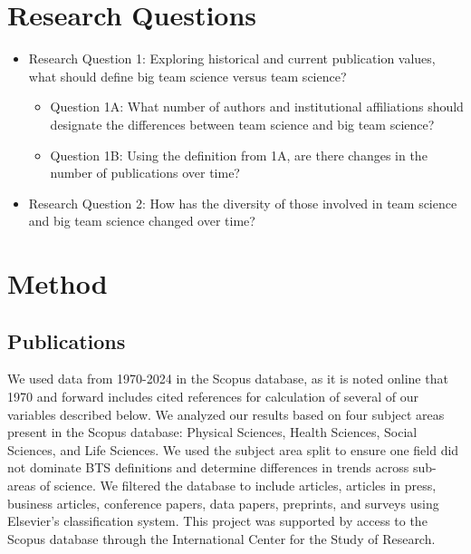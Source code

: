 \documentclass[
  man,floatsintext]{apa7}
\providecommand{\tightlist}{%
  \setlength{\itemsep}{0pt}\setlength{\parskip}{0pt}}
\begin{document}
\section{Research Questions}\label{research-questions}

\begin{itemize}
\tightlist
\item
  Research Question 1: Exploring historical and current publication
  values, what should define big team science versus team science?

  \begin{itemize}
  \tightlist
  \item
    Question 1A: What number of authors and institutional
    affiliations should designate the differences between team
    science and big team science?
  \item
    Question 1B: Using the definition from 1A, are there changes in
    the number of publications over time?
  \end{itemize}
\item
  Research Question 2: How has the diversity of those involved in team
  science and big team science changed over time?
\end{itemize}

\section{Method}\label{method}

\subsection{Publications}\label{publications}

We used data from 1970-2024 in the Scopus database, as it is noted
online that 1970 and forward includes cited references for calculation
of several of our variables described below. We analyzed our results
based on four subject areas present in the Scopus database: Physical
Sciences, Health Sciences, Social Sciences, and Life Sciences. We used
the subject area split to ensure one field did not dominate BTS
definitions and determine differences in trends across sub-areas of
science. We filtered the database to include articles, articles in
press, business articles, conference papers, data papers, preprints, and
surveys using Elsevier's classification system. This project was
supported by access to the Scopus database through the International
Center for the Study of Research.
\end{document}
